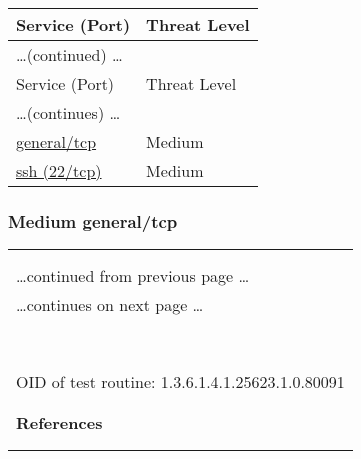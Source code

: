 \documentclass{article}
\begin{document}
\begin{longtable}{|l|l|}
\hline
\rowcolor{openvas_report}Service (Port)&Threat Level\\
\hline
\endfirsthead
\multicolumn{2}{l}{\hfill\ldots (continued) \ldots}\\
\hline
\rowcolor{openvas_report}Service (Port)&Threat Level\\
\hline
\endhead
\hline
\multicolumn{2}{l}{\ldots (continues) \ldots}\\
\endfoot
\hline
\endlastfoot
\hline
\hyperref[port:192.168.248.130 general/tcp Medium]{general/tcp}&Medium\\
\hline
\hyperref[port:192.168.248.130 ssh (22/tcp) Medium]{ssh (22/tcp)}&Medium\\
\hline
\end{longtable}



\subsubsection{Medium general/tcp}
\label{port:192.168.248.130 general/tcp Medium}

\begin{longtable}{|p{}|}
\hline
\rowcolor{openvas_warning}{\color{white}{Medium (CVSS: 2.6) }}\\
\rowcolor{openvas_warning}{\color{white}{NVT: TCP timestamps}}\\
\hline
\endfirsthead
\hfill\ldots continued from previous page \ldots \\
\hline
\endhead
\hline
\ldots continues on next page \ldots \\
\endfoot
\hline
\endlastfoot
\\
\rowcolor{white}{\verb=It was detected that the host implements RFC1323.=}\\
\rowcolor{white}{\verb=The following timestamps were retrieved with a delay of 1 seconds in-between:=}\\
\rowcolor{white}{\verb=Paket 1: 721791790=}\\
\rowcolor{white}{\verb=Paket 2: -351001889=}\\
\rowcolor{white}{\verb==}\\
\rowcolor{white}{\verb==}\\
\\
OID of test routine: 1.3.6.1.4.1.25623.1.0.80091\\
\\

      \hline
      \\
\textbf{References}\\
\rowcolor{white}{\verb=Other:=}\\
\rowcolor{white}{\verb=  URL:http://www.ietf.org/rfc/rfc1323.txt=}\\
\end{longtable}
\end{document}

